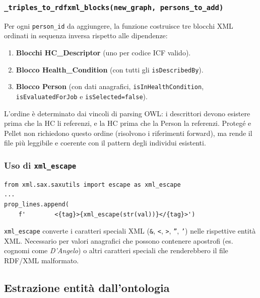 \documentclass[a4paper,12pt]{article}
\begin{document}
\subsubsection{\texttt{\_\allowbreak{}triples\_\allowbreak{}to\_\allowbreak{}rdfxml\_\allowbreak{}blocks(new\_\allowbreak{}graph, persons\_\allowbreak{}to\_\allowbreak{}add)}}

Per ogni \texttt{person\_id} da aggiungere, la funzione costruisce tre
blocchi XML ordinati in sequenza inversa rispetto alle dipendenze:

\begin{enumerate}
  \item \textbf{Blocchi HC\_Descriptor} (uno per codice ICF valido).
  \item \textbf{Blocco Health\_Condition} (con tutti gli \texttt{isDescribedBy}).
  \item \textbf{Blocco Person} (con dati anagrafici, \texttt{isInHealthCondition},
        \texttt{isEvaluatedForJob} e \texttt{isSelected=false}).
\end{enumerate}

L'ordine \`{e} determinato dai vincoli di parsing OWL: i descrittori
devono esistere prima che la HC li referenzi, e la HC prima che la Person
la referenzi. Proteg\'{e} e Pellet non richiedono questo ordine (risolvono
i riferimenti forward), ma rende il file pi\`{u} leggibile e coerente con
il pattern degli individui esistenti.

\subsubsection{Uso di \texttt{xml\_escape}}

\begin{lstlisting}[caption={Escaping XML dei valori anagrafici.}]
from xml.sax.saxutils import escape as xml_escape
...
prop_lines.append(
    f'        <{tag}>{xml_escape(str(val))}</{tag}>')
\end{lstlisting}

\noindent \texttt{xml\_escape} converte i caratteri speciali XML (\texttt{\&},
\texttt{<}, \texttt{>}, \texttt{''}, \texttt{'}) nelle rispettive entit\`{a}
XML. Necessario per valori anagrafici che possono contenere apostrofi
(es. cognomi come \textit{D'Angelo}) o altri caratteri speciali che
renderebbero il file RDF/XML malformato.

\subsection{Estrazione entit\`{a} dall'ontologia}
\end{document}
